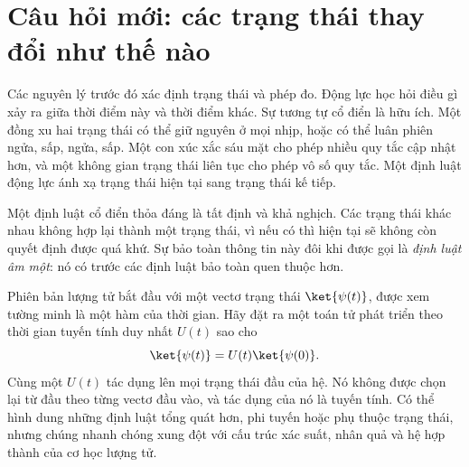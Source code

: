 \begin{classroomqa}
\end{classroomqa}

\begin{classroomqa}
\end{classroomqa}

\section{Câu hỏi mới: các trạng thái thay đổi như thế nào}

Các nguyên lý trước đó xác định trạng thái và phép đo. Động lực học hỏi điều gì xảy ra giữa thời điểm này và thời điểm khác. Sự tương tự cổ điển là hữu ích. Một đồng xu hai trạng thái có thể giữ nguyên ở mọi nhịp, hoặc có thể luân phiên ngửa, sấp, ngửa, sấp. Một con xúc xắc sáu mặt cho phép nhiều quy tắc cập nhật hơn, và một không gian trạng thái liên tục cho phép vô số quy tắc. Một định luật động lực ánh xạ trạng thái hiện tại sang trạng thái kế tiếp.

Một định luật cổ điển thỏa đáng là tất định và khả nghịch. Các trạng thái khác nhau không hợp lại thành một trạng thái, vì nếu có thì hiện tại sẽ không còn quyết định được quá khứ. Sự bảo toàn thông tin này đôi khi được gọi là \emph{định luật âm một}: nó có trước các định luật bảo toàn quen thuộc hơn.

Phiên bản lượng tử bắt đầu với một vectơ trạng thái \(\ket{\psi(t)}\), được xem tường minh là một hàm của thời gian. Hãy đặt ra một toán tử phát triển theo thời gian tuyến tính duy nhất \(U(t)\) sao cho
\begin{equation}
\ket{\psi(t)}=U(t)\ket{\psi(0)}.
\label{eq:l4-time-development}
\end{equation}
Cùng một \(U(t)\) tác dụng lên mọi trạng thái đầu của hệ. Nó không được chọn lại từ đầu theo từng vectơ đầu vào, và tác dụng của nó là tuyến tính. Có thể hình dung những định luật tổng quát hơn, phi tuyến hoặc phụ thuộc trạng thái, nhưng chúng nhanh chóng xung đột với cấu trúc xác suất, nhân quả và hệ hợp thành của cơ học lượng tử.

